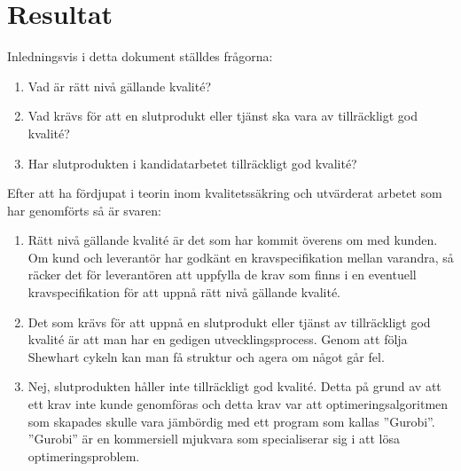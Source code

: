 \section{Resultat}
Inledningsvis i detta dokument ställdes frågorna:

\begin{enumerate}
  \item Vad är rätt nivå gällande kvalité?
  \item Vad krävs för att en slutprodukt eller tjänst ska vara av tillräckligt god kvalité?
  \item Har slutprodukten i kandidatarbetet tillräckligt god kvalité?
\end{enumerate}

\noindent Efter att ha fördjupat i teorin inom kvalitetssäkring och utvärderat arbetet som har genomförts så är svaren:

\begin{enumerate}
  \item Rätt nivå gällande kvalité är det som har kommit överens om med kunden. Om kund och leverantör har godkänt en kravspecifikation mellan varandra, så räcker det för leverantören att uppfylla de krav som finns i en eventuell kravspecifikation för att uppnå rätt nivå gällande kvalité.
  \item Det som krävs för att uppnå en slutprodukt eller tjänst av tillräckligt god kvalité är att man har en gedigen utvecklingsprocess. Genom att följa Shewhart cykeln kan man få struktur och agera om något går fel.
  \item Nej, slutprodukten håller inte tillräckligt god kvalité. Detta på grund av att ett krav inte kunde genomföras och detta krav var att optimeringsalgoritmen som skapades skulle vara jämbördig med ett program som kallas ''Gurobi''. ''Gurobi'' är en kommersiell mjukvara som specialiserar sig i att lösa optimeringsproblem.
\end{enumerate}
